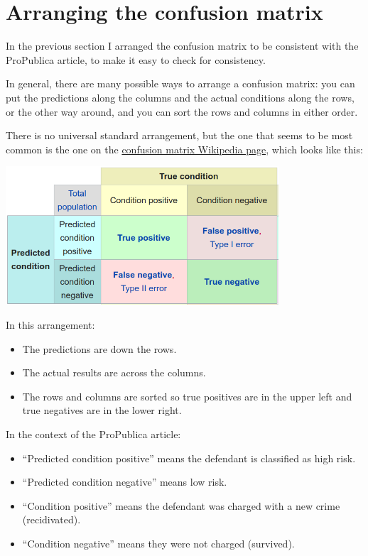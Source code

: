 \hypertarget{arranging-the-confusion-matrix}{%
\section{Arranging the confusion
matrix}\label{arranging-the-confusion-matrix}}

In the previous section I arranged the confusion matrix to be consistent
with the ProPublica article, to make it easy to check for consistency.

In general, there are many possible ways to arrange a confusion matrix:
you can put the predictions along the columns and the actual conditions
along the rows, or the other way around, and you can sort the rows and
columns in either order.

There is no universal standard arrangement, but the one that seems to be
most common is the one on the
\href{https://en.wikipedia.org/wiki/Confusion_matrix}{confusion matrix
Wikipedia page}, which looks like this:

\includegraphics[width=4in]{figs/confusion_matrix1.png}

In this arrangement:

\begin{itemize}
\item
  The predictions are down the rows.
\item
  The actual results are across the columns.
\item
  The rows and columns are sorted so true positives are in the upper
  left and true negatives are in the lower right.
\end{itemize}

In the context of the ProPublica article:

\begin{itemize}
\item
  ``Predicted condition positive'' means the defendant is classified as
  high risk.
\item
  ``Predicted condition negative'' means low risk.
\item
  ``Condition positive'' means the defendant was charged with a new
  crime (recidivated).
\item
  ``Condition negative'' means they were not charged (survived).
\end{itemize}

